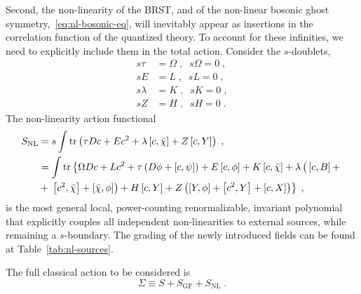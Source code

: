 \documentclass[../main.tex]{subfiles}
\begin{document}
Second, the non-linearity of the BRST, and of the non-linear bosonic ghost symmetry,~\eqref{eq:nl-bosonic-eq}, will inevitably appear as insertions in the correlation function of the quantized theory. To account for these infinities, we need to explicitly include them in the total action. Consider the $ s $-doublets,
\begin{subequations}%
  \label{eq:nl-s-doublets}
  \begin{align}
    s\tau    & = \Omega \;, \;\; s\Omega   = 0 \;, \\
    sE       & = L \;, \;\; sL        = 0 \;,      \\
    s\lambda & = K \;, \;\; sK        = 0 \;,      \\
    sZ       & = H \;, \;\; sH        = 0 \;.
  \end{align}
\end{subequations}
The non-linearity action functional
\begin{subequations}%
  \label{eq:nl-action}
  \begin{align}
    S_{\text{NL}} & = s \int \operatorname{tr} \left( \tau Dc + E c^2 + \lambda \left[ c,\bar\chi \right] + Z \left[ c,Y \right] \right) \;, \label{eq:nl-action-1}                                                                                           \\
                  & = \int \operatorname{tr} \left\{ \Omega Dc + Lc^2 + \tau \left( D\phi + \left[ c,\psi \right] \right) + E \left[ c,\phi \right] + K \left[ c,\bar\chi \right] + \lambda \left(\vphantom{^2}\left[ c,B \right] + \right. \right. \nonumber \\
                  & + \left. \left. \left[ c^2,\bar\chi \right] + \left[ \bar\chi,\phi \right] \right) + H \left[ c, Y \right] + Z \left( \left[ Y, \phi \right] + \left[ c^2, Y \right] + \left[ c, X \right] \right) \right\} \;,
  \end{align}
\end{subequations}
is the most general local, power-counting renormalizable, invariant polynomial that explicitly couples all independent non-linearities to external sources, while remaining a $ s $-boundary. The grading of the newly introduced fields can be found at Table~\ref{tab:nl-sources}.

The full classical action to be considered is
\begin{equation}
  \label{eq:total-action}
  \Sigma \equiv S + S_{\text{GF}} + S_{ \text{NL} }\; .
\end{equation}
\end{document}

